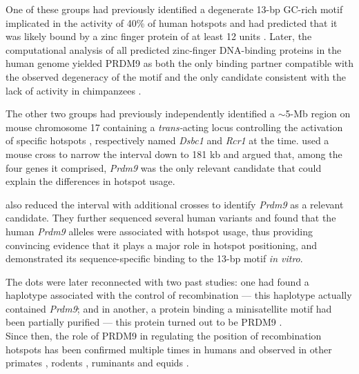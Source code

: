 One of these groups had previously identified a degenerate 13-bp GC-rich motif \citep{myers2005finescale} implicated in the activity of 40\% of human hotspots \citep{myers2008common,webb2008sperm} and had predicted that it was likely bound by a zinc finger protein of at least 12 units \citep{myers2008common}.
Later, the computational analysis of all predicted zinc-finger DNA-binding proteins in the human genome yielded PRDM9 as both the only binding partner compatible with the observed degeneracy of the motif and the only candidate consistent with the lack of activity in chimpanzees \citep{myers2010drive}.

The other two groups had previously independently identified a $\sim$5-Mb region on mouse chromosome 17 containing a \textit{trans-}acting locus controlling the activation of specific hotspots \citep{grey2009genomewide,parvanov2009transregulation}, respectively named \textit{Dsbc1} and \textit{Rcr1} at the time.
\citet{parvanov2010prdm9} used a mouse cross to narrow the interval down to 181 kb and argued that, among the four genes it comprised, \textit{Prdm9} was the only relevant candidate that could explain the differences in hotspot usage.

\citet{baudat2010prdm9} also reduced the interval with additional crosses to identify \textit{Prdm9} as a relevant candidate. 
They further sequenced several human variants and found that the human \textit{Prdm9} alleles were associated with hotspot usage, thus providing convincing evidence that it plays a major role in hotspot positioning, and demonstrated its sequence-specific binding to the 13-bp motif \textit{in vitro}.

The dots were later reconnected with two past studies: one had found a haplotype associated with the control of recombination \citep{shiroishi1982new} — this haplotype actually contained \textit{Prdm9}; and in another, a protein binding a minisatellite motif had been partially purified \citep{wahls1991two} — this protein turned out to be PRDM9 \citep{wahls2011dna}.\\

Since then, the role of PRDM9 in regulating the position of recombination hotspots has been confirmed multiple times in humans \citep{berg2010prdm9,pratto2014recombination} and observed in other primates \citep{groeneveld2012high,heerschop2016pioneering,schwartz2014primate}, rodents \citep{buard2014diversity,capilla2014genetic,kono2014prdm9}, ruminants \citep{sandor2012genetic,ahlawat2016zinc,ahlawat2016evidence,ahlawat2017evolutionary} and equids \citep{steiner2013characterization}.

